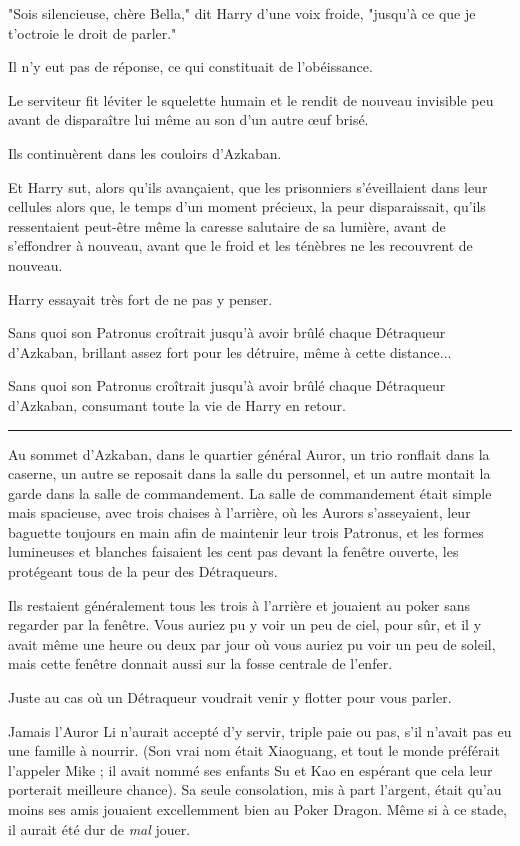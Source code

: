 "Sois silencieuse, chère Bella," dit Harry d'une voix froide, "jusqu'à ce que je t'octroie le droit de parler."

Il n'y eut pas de réponse, ce qui constituait de l'obéissance.

Le serviteur fit léviter le squelette humain et le rendit de nouveau invisible peu avant de disparaître lui même au son d'un autre œuf brisé.

Ils continuèrent dans les couloirs d'Azkaban.

Et Harry sut, alors qu'ils avançaient, que les prisonniers s'éveillaient dans leur cellules alors que, le temps d'un moment précieux, la peur disparaissait, qu'ils ressentaient peut-être même la caresse salutaire de sa lumière, avant de s'effondrer à nouveau, avant que le froid et les ténèbres ne les recouvrent de nouveau.

Harry essayait très fort de ne pas y penser.

Sans quoi son Patronus croîtrait jusqu'à avoir brûlé chaque Détraqueur d'Azkaban, brillant assez fort pour les détruire, même à cette distance...

Sans quoi son Patronus croîtrait jusqu'à avoir brûlé chaque Détraqueur d'Azkaban, consumant toute la vie de Harry en retour.
\par\noindent\rule{\textwidth}{0.4pt}
Au sommet d'Azkaban, dans le quartier général Auror, un trio ronflait dans la caserne, un autre se reposait dans la salle du personnel, et un autre montait la garde dans la salle de commandement. La salle de commandement était simple mais spacieuse, avec trois chaises à l'arrière, où les Aurors s'asseyaient, leur baguette toujours en main afin de maintenir leur trois Patronus, et les formes lumineuses et blanches faisaient les cent pas devant la fenêtre ouverte, les protégeant tous de la peur des Détraqueurs.

Ils restaient généralement tous les trois à l'arrière et jouaient au poker sans regarder par la fenêtre. Vous auriez pu y voir un peu de ciel, pour sûr, et il y avait même une heure ou deux par jour où vous auriez pu voir un peu de soleil, mais cette fenêtre donnait aussi sur la fosse centrale de l'enfer.

Juste au cas où un Détraqueur voudrait venir y flotter pour vous parler.

Jamais l'Auror Li n'aurait accepté d'y servir, triple paie ou pas, s'il n'avait pas eu une famille à nourrir. (Son vrai nom était Xiaoguang, et tout le monde préférait l'appeler Mike ; il avait nommé ses enfants Su et Kao en espérant que cela leur porterait meilleure chance). Sa seule consolation, mis à part l'argent, était qu'au moins ses amis jouaient excellemment bien au Poker Dragon. Même si à ce stade, il aurait été dur de \emph{mal}  jouer.

